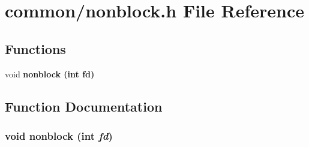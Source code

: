 \section{common/nonblock.h File Reference}
\label{nonblock_8h}
\subsection*{Functions}
\begin{CompactItemize}
\item 
void \bf{nonblock} (int fd)
\end{CompactItemize}


\subsection{Function Documentation}
\subsubsection{\setlength{\rightskip}{0pt plus 5cm}void nonblock (int {\em fd})}\label{nonblock_8h_0bc329b3d35a534cea0f4ec01362e65b}



